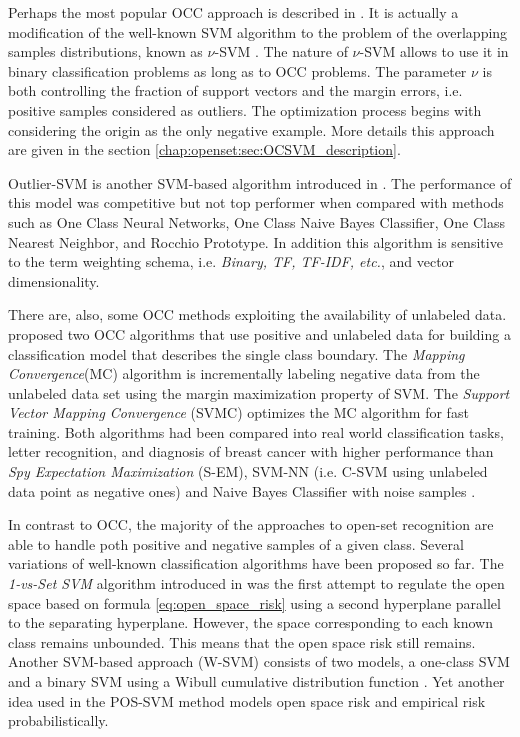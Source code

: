 Perhaps the most popular OCC approach is described in \parencite{scholkopf1999estimating}. It is actually a modification of the well-known SVM algorithm to the problem of the overlapping samples distributions, known as $\nu$-SVM \parencite{bishop2006}. The nature of $\nu$-SVM allows to use it in binary classification problems as long as to OCC problems. The parameter $\nu$ is both controlling the fraction of support vectors and the margin errors, i.e. positive samples considered as outliers. The optimization process begins with considering the origin as the only negative example. More details this approach are given in the section \ref{chap:openset:sec:OCSVM_description}.

Outlier-SVM is another SVM-based algorithm introduced in \parencite{manevitz2002one,khan2010survey}. The performance of this model was competitive but not top performer when compared with methods such as One Class Neural Networks, One Class Naive Bayes Classifier, One Class Nearest Neighbor, and Rocchio Prototype. In addition this algorithm is sensitive to the term weighting schema, i.e. \textit{Binary, TF, TF-IDF, etc.}, and vector dimensionality. 

There are, also, some OCC methods exploiting the availability of unlabeled data. \parencite{yu2005single} proposed two OCC algorithms that use positive and unlabeled data for building a classification model that describes the single class boundary. The \textit{Mapping Convergence}(MC) algorithm is incrementally labeling negative data from the unlabeled data set using the margin maximization property of SVM. The \textit{Support Vector Mapping Convergence} (SVMC) optimizes the MC algorithm for fast training. Both algorithms had been compared into real world  classification tasks, letter recognition, and diagnosis of breast cancer with higher performance than \textit{Spy Expectation Maximization} (S-EM), SVM-NN (i.e. C-SVM using unlabeled data point as negative ones) and Naive Bayes Classifier with noise samples \parencite{liu2002partially, li2003learning}.

In contrast to OCC, the majority of the approaches to open-set recognition are able to handle poth positive and negative samples of a given class. Several variations of well-known classification algorithms have been proposed so far. The \textit{1-vs-Set SVM} algorithm introduced in \parencite{scheirer2013toward} was the first attempt to regulate the open space based on formula \ref{eq:open_space_risk} using a second hyperplane parallel to the separating hyperplane. However, the space corresponding to each known class remains unbounded. This means that the open space risk still remains. Another SVM-based approach (W-SVM) consists of two models, a one-class SVM and a binary SVM using a Wibull cumulative distribution function \parencite{scheirer2014probability}. Yet another idea used in the POS-SVM method \parencite{scherreik2016open} models open space risk and empirical risk probabilistically. 

